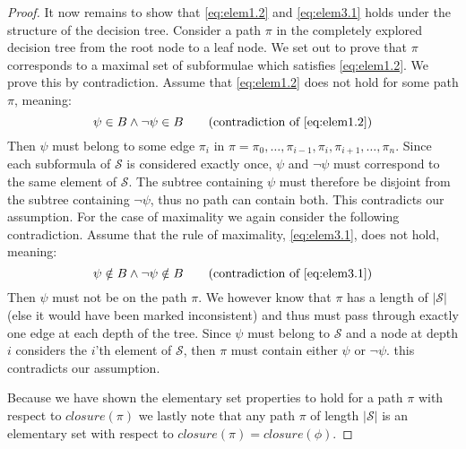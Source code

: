 \begin{proof}
It now remains to show that \autoref{eq:elem1.2} and \autoref{eq:elem3.1} holds under the structure of the decision tree. Consider a path $\pi$ in the completely explored decision tree from the root node to a leaf node. We set out to prove that $\pi$ corresponds to a maximal set of subformulae which satisfies \autoref{eq:elem1.2}. We prove this by contradiction. Assume that \autoref{eq:elem1.2} does not hold for some path $\pi$, meaning:
\begin{equation*}
    \psi \in B \land \lnot \psi \in B \tag{contradiction of \ref{eq:elem1.2}}
\end{equation*}
Then $\psi$ must belong to some edge $\pi_i$ in $\pi = \pi_0, \ldots, \pi_{i-1}, \pi_i, \pi_{i+1},\ldots,\pi_n$. Since each subformula of $\mathcal{S}$ is considered exactly once, $\psi$ and $\lnot \psi$ must correspond to the same element of $\mathcal{S}$. The subtree containing $\psi$ must therefore be disjoint from the subtree containing $\lnot\psi$, thus no path can contain both. This contradicts our assumption.
For the case of maximality we again consider the following contradiction. Assume that the rule of maximality, \autoref{eq:elem3.1}, does not hold, meaning:
\begin{equation*}
    \psi \notin B \land \lnot \psi \notin B \tag{contradiction of \ref{eq:elem3.1}}
\end{equation*}
Then $\psi$ must not be on the path $\pi$. We however know that $\pi$ has a length of $|\mathcal{S}|$ (else it would have been marked inconsistent) and thus must pass through exactly one edge at each depth of the tree. Since $\psi$ must belong to $\mathcal{S}$ and a node at depth $i$ considers the $i$'th element of $\mathcal{S}$, then $\pi$ must contain either $\psi$ or $\lnot\psi$. this contradicts our assumption.

Because we have shown the elementary set properties to hold for a path $\pi$ with respect to $closure(\pi)$ we lastly note that any path $\pi$ of length $|\mathcal{S}|$ is an elementary set with respect to $closure(\pi)=closure(\phi)$.
\end{proof}

